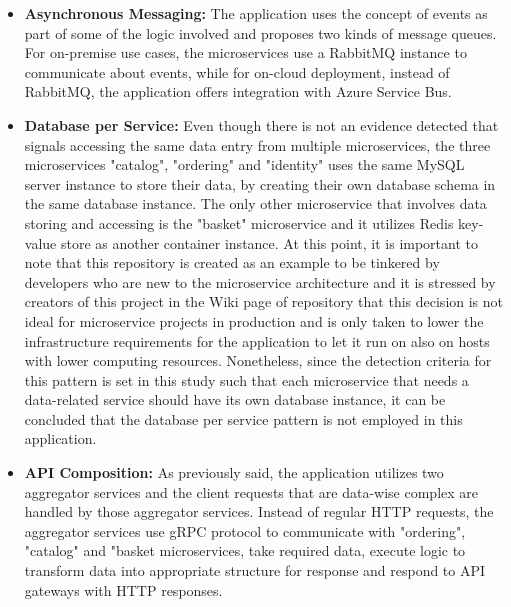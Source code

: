 \documentclass{Configuration_Files/PoliMi3i_thesis}
\begin{document}
\begin{itemize}
    \item \textbf{Asynchronous Messaging:} The application uses the concept of events as part of some of the logic involved and proposes two kinds of message queues.
    For on-premise use cases, the microservices use a RabbitMQ instance to communicate about events, while for on-cloud deployment, instead of RabbitMQ, the application offers integration with Azure Service Bus.
    
    \item \textbf{Database per Service:} Even though there is not an evidence detected that signals accessing the same data entry from multiple microservices, the three microservices "catalog", "ordering" and "identity" uses the same MySQL server instance to store their data, by creating their own database schema in the same database instance.
    The only other microservice that involves data storing and accessing is the "basket" microservice and it utilizes Redis key-value store as another container instance.
    At this point, it is important to note that this repository is created as an example to be tinkered by developers who are new to the microservice architecture and it is stressed by creators of this project in the Wiki page of repository that this decision is not ideal for microservice projects in production and is only taken to lower the infrastructure requirements for the application to let it run on also on hosts with lower computing resources.
    Nonetheless, since the detection criteria for this pattern is set in this study such that each microservice that needs a data-related service should have its own database instance, it can be concluded that the database per service pattern is not employed in this application.
    
    \item \textbf{API Composition:} As previously said, the application utilizes two aggregator services and the client requests that are data-wise complex are handled by those aggregator services.
    Instead of regular HTTP requests, the aggregator services use gRPC protocol to communicate with "ordering", "catalog" and "basket microservices, take required data, execute logic to transform data into appropriate structure for response and respond to API gateways with HTTP responses.
    

\end{itemize}
\end{document}
